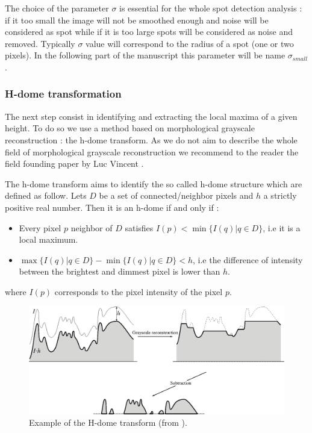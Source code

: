 \documentclass[12pt]{article}
\begin{document}
The choice of the parameter $\sigma$ is essential for the whole spot detection analysis : if it too small the image will not be smoothed enough and noise will be considered as spot while if it is too large spots will be considered as noise and removed. Typically $\sigma$ value will correspond to the radius of a spot (one or two pixels). In the following part of the manuscript this parameter will be name $\sigma_{small}$.

\subsubsection{H-dome transformation}

The next step consist in identifying and extracting the local maxima of a given height. To do so we use a method based on morphological grayscale reconstruction : the h-dome transform. As we do not aim to describe the whole field of morphological grayscale reconstruction we recommend to the reader the field founding paper by Luc Vincent \citep{vincent_morphological_1993}.

The h-dome transform aims to identify the so called h-dome structure which are defined as follow. Lets $D$ be a set of connected/neighbor pixels and $h$ a strictly positive real number. Then it is an h-dome if and only if :
\begin{itemize}
\item Every pixel $p$ neighbor of $D$ satisfies $I(p) < \min\{ I(q) | q \in D \}$, i.e it is a local maximum.
\item  $\max\{ I(q) | q \in D \} -\min\{ I(q) | q \in D \}  < h $, i.e the difference of intensity between the brightest and dimmest pixel is lower than $h$.
\end{itemize}
where $I(p)$ corresponds to the pixel intensity of the pixel $p$.

 
\begin{figure}[!h]
	\begin{center}
		\includegraphics[width=1\linewidth]{H_dome.png}
		\caption{Example of the H-dome transform (from \citep{vincent_morphological_1993}).}
		\label{Fig:H_dome}
	\end{center}
\end{figure}
 
\end{document}
